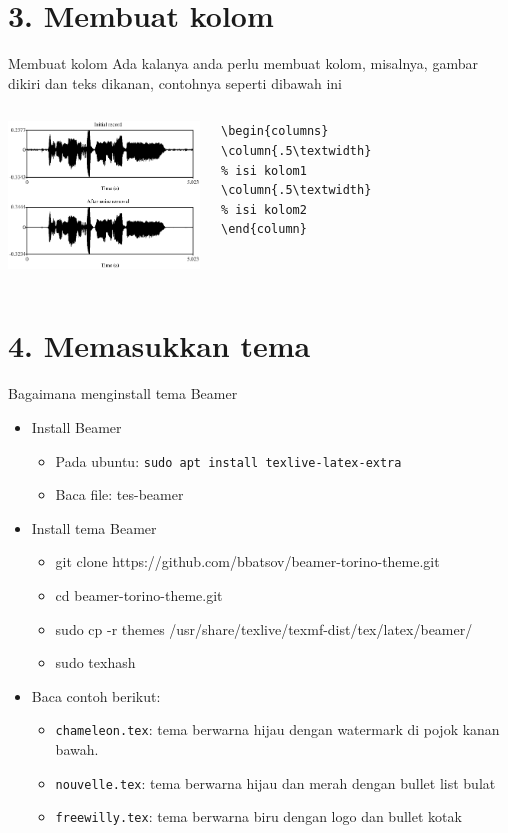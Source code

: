 \documentclass{beamer}
\begin{document}
\section{3. Membuat kolom}
\begin{frame}[t, fragile] {Membuat kolom}
Ada kalanya anda perlu membuat kolom, misalnya, gambar dikiri dan teks dikanan, contohnya seperti dibawah ini \\
\begin{columns}
\includegraphics[width=2in]{pict/praat.eps}
\begin{verbatim}
\begin{columns}
\column{.5\textwidth}
% isi kolom1
\column{.5\textwidth}
% isi kolom2
\end{column}
\end{verbatim}
\end{columns}
\end{frame}

\section{4. Memasukkan tema}
\begin{frame}[t,fragile]{Bagaimana menginstall tema Beamer }
\begin{itemize}
\item Install Beamer
  \begin{itemize}
  \item Pada ubuntu: \verb!sudo apt install texlive-latex-extra!
  \item Baca file: tes-beamer
  \end{itemize}
\item Install tema Beamer
  \begin{itemize}
  \item git clone https://github.com/bbatsov/beamer-torino-theme.git
  \item cd beamer-torino-theme.git
  \item sudo cp -r themes /usr/share/texlive/texmf-dist/tex/latex/beamer/
  \item sudo texhash
  \end{itemize}
\item Baca contoh berikut:
  \begin{itemize}
  \item \verb!chameleon.tex!: tema berwarna hijau dengan watermark di pojok kanan bawah.
  \item \verb!nouvelle.tex!: tema berwarna hijau dan merah dengan bullet list bulat
  \item \verb!freewilly.tex!: tema berwarna biru dengan logo dan bullet kotak
  \end{itemize}
\end{itemize}
\end{frame}
\end{document}
